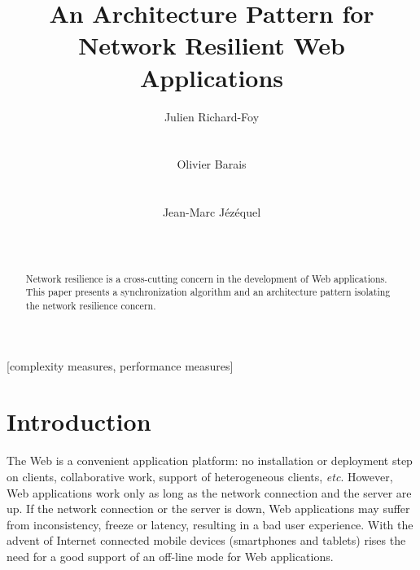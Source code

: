 \documentclass{acm_proc_article-sp}
\begin{document}
\title{An Architecture Pattern for Network Resilient Web Applications}

\author{
\alignauthor
Julien Richard-Foy\\
       \\
       \\
\alignauthor
Olivier Barais\\
       \\
       \\
\alignauthor Jean-Marc Jézéquel\\
       \\
       \\
}

\maketitle
\begin{abstract}
Network resilience is a cross-cutting concern in the development of Web applications. This paper presents a synchronization algorithm and an architecture pattern isolating the network resilience concern.
\end{abstract}

[complexity measures, performance measures]



\section{Introduction}

The Web is a convenient application platform: no installation or deployment step on clients, collaborative work, support of heterogeneous clients, \textit{etc}. However, Web applications work only as long as the network connection and the server are up. If the network connection or the server is down, Web applications may suffer from inconsistency, freeze or latency, resulting in a bad user experience. With the advent of Internet connected mobile devices (smartphones and tablets) rises the need for a good support of an off-line mode for Web applications.
\end{document}

